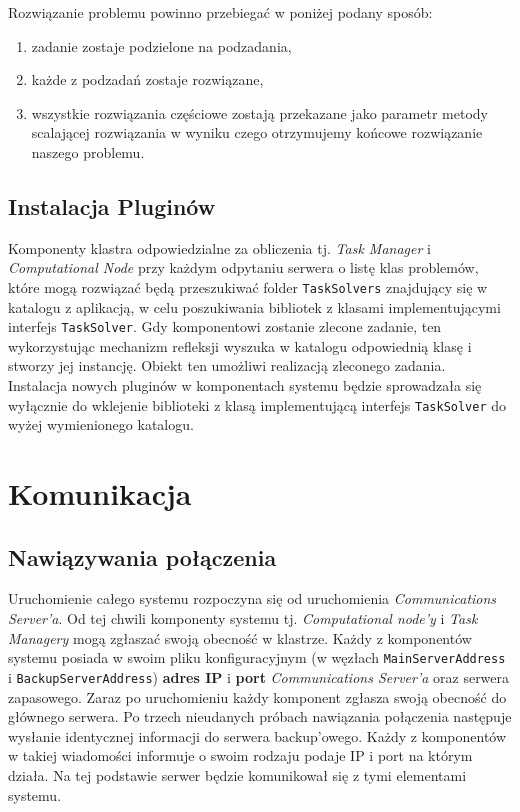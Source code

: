 \documentclass[12pt,a4paper,titlepage]{report}
\begin{document}
	Rozwiązanie problemu powinno przebiegać w poniżej podany sposób:
		\begin{enumerate}[(1)]
			\item zadanie zostaje podzielone na podzadania,
			\item każde z podzadań zostaje rozwiązane,
			\item wszystkie rozwiązania częściowe zostają przekazane jako parametr metody scalającej rozwiązania
			w wyniku czego otrzymujemy końcowe rozwiązanie naszego problemu.
		\end{enumerate}
	 \section{Instalacja Pluginów}
	Komponenty klastra odpowiedzialne za obliczenia tj. \textit{Task Manager} i \textit{Computational Node} przy każdym odpytaniu serwera o listę klas problemów, które mogą rozwiązać będą przeszukiwać folder \verb+TaskSolvers+ znajdujący się w katalogu z aplikacją, w celu poszukiwania bibliotek z klasami implementującymi interfejs \verb+TaskSolver+. Gdy komponentowi zostanie zlecone zadanie, ten wykorzystując mechanizm refleksji wyszuka w katalogu odpowiednią klasę i stworzy jej instancję. Obiekt ten  umożliwi realizacją zleconego zadania.\\
	 Instalacja nowych pluginów w komponentach systemu będzie sprowadzała się wyłącznie do wklejenie biblioteki z klasą implementującą interfejs \verb+TaskSolver+ do wyżej wymienionego katalogu.
	 
	\chapter{Komunikacja}
		\section{Nawiązywania połączenia}
	Uruchomienie całego systemu rozpoczyna się od uruchomienia \textit{Communications Server'a}. Od tej chwili komponenty systemu tj. 
	\textit{Computational node'y}	i \textit{Task Managery} mogą zgłaszać swoją obecność w klastrze. Każdy z komponentów systemu 
	posiada w swoim pliku konfiguracyjnym (w węzłach \verb+MainServerAddress+ i \verb+BackupServerAddress+) \textbf{adres IP} i
	 \textbf{port} \textit{Communications Server'a} oraz serwera zapasowego. Zaraz po uruchomieniu każdy komponent
	zgłasza swoją obecność do głównego serwera. Po trzech nieudanych próbach nawiązania połączenia następuje
	wysłanie identycznej informacji do serwera backup'owego. Każdy z komponentów w takiej wiadomości informuje o swoim rodzaju podaje
	IP i port na którym	działa. Na tej podstawie serwer będzie komunikował się z tymi elementami systemu.\\
	
\end{document}
